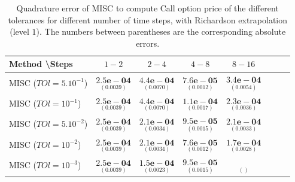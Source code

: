 \documentclass[11pt]{article}
\begin{document}
\begin{table}[h!]
	\centering
	\begin{tabular}{l*{6}{c}r}
		Method \textbackslash  Steps            & $1-2$ & $2-4$ & $4-8$ & $8-16$  \\
		\hline
		MISC ($TOl=5.10^{-1}$)  & $\underset{(0.0039
			)}{\mathbf{ 2.5e-04}}$ & $\underset{(0.0070)}{\mathbf{4.4e-04}}$  & $\underset{(0.0012
			)}{\mathbf{7.6e-05}}$ &$\underset{(0.0054)}{\mathbf{3.4e-04}}$ \\
		MISC ($TOl=10^{-1}$)   & $\underset{(0.0039
			)}{\mathbf{ 2.5e-04}}$ & $\underset{(0.0070)}{\mathbf{4.4e-04}}$  & $\underset{(  0.0017)}{\mathbf{1.1e-04}}$ &$\underset{(0.0036)}{\mathbf{2.3e-04}}$ \\
		MISC ($TOl=5.10^{-2}$)  & $\underset{(0.0039
			)}{\mathbf{ 2.5e-04}}$ & $\underset{(0.0034)}{\mathbf{2.1e-04}}$  & $\underset{(    0.0015)}{\mathbf{9.5e-05}}$ &$\underset{(0.0033)}{\mathbf{2.1e-04}}$ \\
		MISC ($TOl=10^{-2}$)  & $\underset{(0.0039
			)}{\mathbf{ 2.5e-04}}$ & $\underset{(0.0034)}{\mathbf{2.1e-04}}$  & $\underset{(0.0012
			)}{\mathbf{7.6e-05}}$&$\underset{(0.0028
			)}{\mathbf{1.7e-04}}$ \\
		MISC ($TOl=10^{-3}$)  & $\underset{(0.0039
			)}{\mathbf{ 2.5e-04}}$ & $\underset{(0.0023
			)}{\mathbf{1.5e-04}}$   &$\underset{(    0.0015)}{\mathbf{9.5e-05}}$ & $\underset{()}{\mathbf{}}$ \\
		
		\hline
	\end{tabular}
	\caption{Quadrature error of MISC to compute Call option price of the different tolerances for different number of time steps, with Richardson extrapolation (level $1$). The numbers between parentheses are the corresponding absolute errors.}
	\label{Quadrature error of MISC to compute Call option price of the different tolerances for different number of time steps, with Richardson extrapolation (level $1$). The numbers between parentheses are the corresponding absolute errors.}
\end{table}
\end{document}
